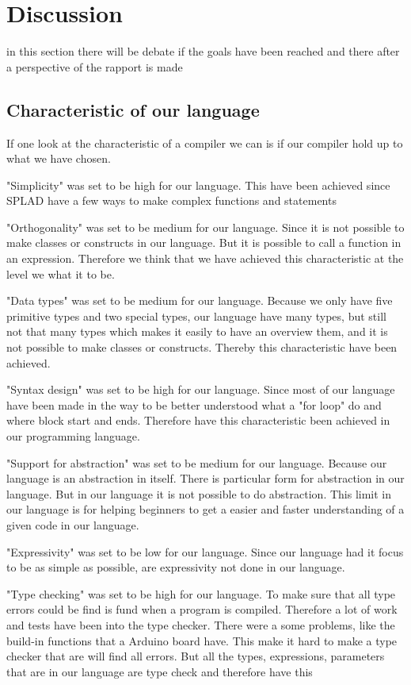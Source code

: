 \section{Discussion}
\label{sec:discussion}
in this section there will be debate if the goals have been reached and there after a perspective of the rapport is made

\subsection{Characteristic of our language}
If one look at the characteristic of a compiler we can is if our compiler hold up to what we have chosen.

"Simplicity" was set to be high for our language. This have been achieved since SPLAD have a few ways to make complex functions and statements

"Orthogonality" was set to be medium for our language. Since it is  not possible to make classes or constructs in our language. But it is possible to call a function in an expression. Therefore we think that we have achieved this characteristic  at the level we what it to be.

"Data types" was set to be medium for our language. Because we only have five primitive types and two special types, our language have many types, but still not that many types which makes it easily to have an overview them, and it is not possible to make classes or constructs. Thereby this characteristic  have been achieved.

"Syntax design" was set to be high for our language. Since most of our language have been made in the way to be better understood what a "for loop" do and where block start and ends. Therefore have this characteristic  been achieved in our programming language.

"Support for abstraction" was set to be medium for our language. Because our language is an abstraction in itself. There is particular form for abstraction in our language. But in our language it is not possible to do abstraction. This limit in our language is for helping beginners to get a easier and faster understanding of a given code in our language.

"Expressivity" was set to be low for our language. Since our language had it focus to be as simple as possible, are expressivity not done in our language. 


"Type checking" was set to be high for our language. To make sure that all type errors could be find is fund when a program is compiled. Therefore a lot of work and tests have been into the type checker. There were a some problems, like the build-in functions that a Arduino board have. This make it hard to make a type checker that are will find all errors. But all the types, expressions, parameters that are in our language are type check and therefore have this 


